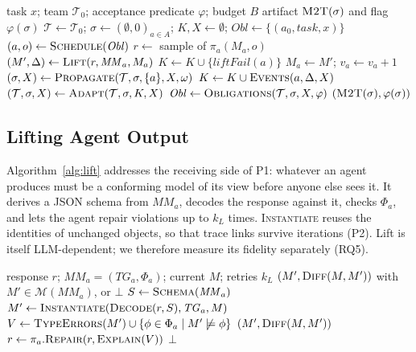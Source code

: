 \documentclass[10pt, anonymous, conference]{IEEEtran}
\theoremstyle{definition}
\theoremstyle{plain}
\theoremstyle{remark}
\newcommand{\MM}{\mathit{MM}}
\newcommand{\Mods}[1]{\mathcal{M}(#1)}
\newcommand{\team}{\mathcal{T}}
\begin{document}
\begin{algorithm}[t]
\caption{\textsc{RunTeam}: orchestration (L1)}\label{alg:run}
\small
\begin{algorithmic}[1]
\Input task $x$; team $\team_0$; acceptance predicate $\varphi$; budget $B$
\Output artifact $\textsc{M2T}(\sigma)$ and flag $\varphi(\sigma)$
\State $\team\gets\team_0$;\; $\sigma\gets(\emptyset,0)_{a\in A}$;\;
       $K,X\gets\emptyset$;\; $\mathit{Obl}\gets\{(a_0,\mathit{task},x)\}$
\label{ln:run-loop}
  \State $(a,o)\gets\textsc{Schedule}(\mathit{Obl})$
  \State $r\gets$ sample of $\pi_a(M_a,o)$ 
  \State $(M',\Delta)\gets\textsc{Lift}(r,\MM_a,M_a)$
         \label{ln:run-lift}
   $K\gets K\cup\{\mathit{liftFail}(a)\}$
  \Else
    \State $M_a\gets M'$;\; $v_a\gets v_a+1$
    \State $(\sigma,X)\gets\textsc{Propagate}(\team,\sigma,\{a\},X,\omega)$
           \label{ln:run-prop}
    \State $K\gets K\cup\textsc{Events}(a,\Delta,X)$
  \EndIf
  \State $(\team,\sigma,X)\gets\textsc{Adapt}(\team,\sigma,K,X)$
         \label{ln:run-adapt}
  \State $\mathit{Obl}\gets\textsc{Obligations}(\team,\sigma,X,\varphi)$
\EndWhile
\State \Return $(\textsc{M2T}(\sigma),\varphi(\sigma))$\label{ln:run-ret}
\end{algorithmic}
\end{algorithm}

\subsection{Lifting Agent Output}\label{subsec:lift}
Algorithm~\ref{alg:lift} addresses the receiving side of P1: whatever an agent
produces must be a conforming model of its view before anyone else sees it. It
derives a JSON schema from $\MM_a$, decodes the response against it, checks
$\Phi_a$, and lets the agent repair violations up to $k_L$ times.
\textsc{Instantiate} reuses the identities of unchanged objects, so that trace
links survive iterations (P2). Lift is itself LLM-dependent; we therefore
measure its fidelity separately (RQ5).

\begin{algorithm}[t]
\caption{\textsc{Lift}: response to conforming view model (L0)}
\label{alg:lift}
\small
\begin{algorithmic}[1]
\Input response $r$; $\MM_a=(\mathit{TG}_a,\Phi_a)$; current $M$; retries $k_L$
\Output $(M',\textsc{Diff}(M,M'))$ with $M'\in\Mods{\MM_a}$, or $\bot$
\State $S\gets\textsc{Schema}(\MM_a)$
  \State $M'\gets\textsc{Instantiate}(\textsc{Decode}(r,S),\mathit{TG}_a,M)$
  \State $V\gets\textsc{TypeErrors}(M')\cup\{\phi\in\Phi_a\mid M'\not\models\phi\}$
   \Return $(M',\textsc{Diff}(M,M'))$ \EndIf
  \State $r\gets\pi_a.\textsc{Repair}(r,\textsc{Explain}(V))$
\EndFor
\State \Return $\bot$
\end{algorithmic}
\end{algorithm}
\end{document}
